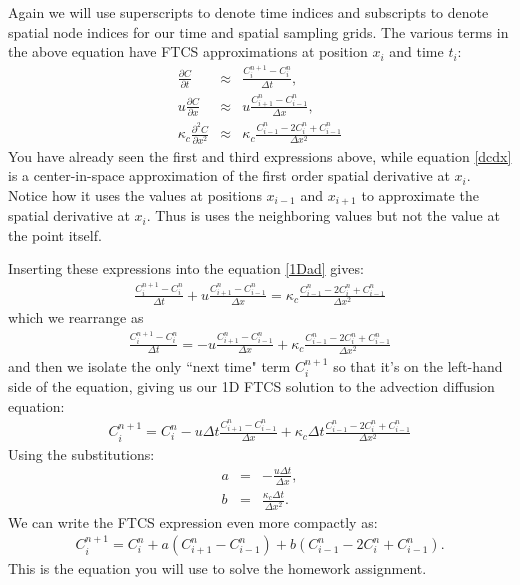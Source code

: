 \documentclass[11pt, oneside]{article}   	%
\begin{document}
Again we will use superscripts to denote time indices and subscripts to denote spatial node indices for our time and spatial sampling grids. The various terms in the above equation have FTCS approximations at position $ x_i$ and time $ t_i$:
\begin{eqnarray}
	\frac{\partial C}{\partial t} &\approx& \frac{C^{n+1}_i - C^n_i}{\Delta t} , \\
	u\frac{\partial C}{\partial x} &\approx& u \frac{C^{n}_{i+1} - C^n_{i-1}}{\Delta x} , \label{dcdx} \\
	\kappa_c\frac{\partial^2 C}{\partial x^2} &\approx& \kappa_c \frac{C^{n}_{i-1} - 2 C^n_{i}+C^n_{i-1}}{\Delta x^2}
\end{eqnarray}
You have already seen the first and third expressions above, while equation \ref{dcdx} is a center-in-space approximation of the first order spatial derivative at $x_i$. Notice how it uses the values at positions $x_{i-1}$ and $x_{i+1}$ to approximate the spatial derivative at $x_i$. Thus is uses the neighboring values but not the value at the point itself. 

Inserting these expressions into the equation \ref{1Dad} gives:
\begin{eqnarray}
	 \frac{C^{n+1}_i - C^n_i}{\Delta t} + u \frac{C^{n}_{i+1} - C^n_{i-1}}{\Delta x} = \kappa_c \frac{C^{n}_{i-1} - 2 C^n_{i}+C^n_{i-1}}{\Delta x^2}
\end{eqnarray}
which we rearrange as
\begin{eqnarray}
	 \frac{C^{n+1}_i - C^n_i}{\Delta t} = - u \frac{C^{n}_{i+1} - C^n_{i-1}}{\Delta x} + \kappa_c \frac{C^{n}_{i-1} - 2 C^n_{i}+C^n_{i-1}}{\Delta x^2}
\end{eqnarray}
and then we isolate the only ``next time" term $C^{n+1}_i$ so that it's on the left-hand side of the equation, giving us our 1D FTCS solution to the advection diffusion equation:
\begin{eqnarray}
	C^{n+1}_i = C^n_i - u \Delta t \frac{C^{n}_{i+1} - C^n_{i-1}}{\Delta x} + \kappa_c \Delta t \frac{C^{n}_{i-1} - 2 C^n_{i}+C^n_{i-1}}{\Delta x^2}
\end{eqnarray}
Using the substitutions:
\begin{eqnarray}
	a &=&  - \frac{ u \Delta t}{\Delta x},  \\
	b &=&   \frac{\kappa_c \Delta t}{\Delta x^2}.
\end{eqnarray}
We can write the FTCS expression even more compactly as:
\begin{eqnarray}
	C^{n+1}_i = C^n_i + a \left ( {C^{n}_{i+1} - C^n_{i-1}}\right ) +  b 
\left ( {C^{n}_{i-1} - 2 C^n_{i}+C^n_{i-1}} \right ).
\end{eqnarray}
This is the equation you will use to solve the homework assignment.
\end{document}
